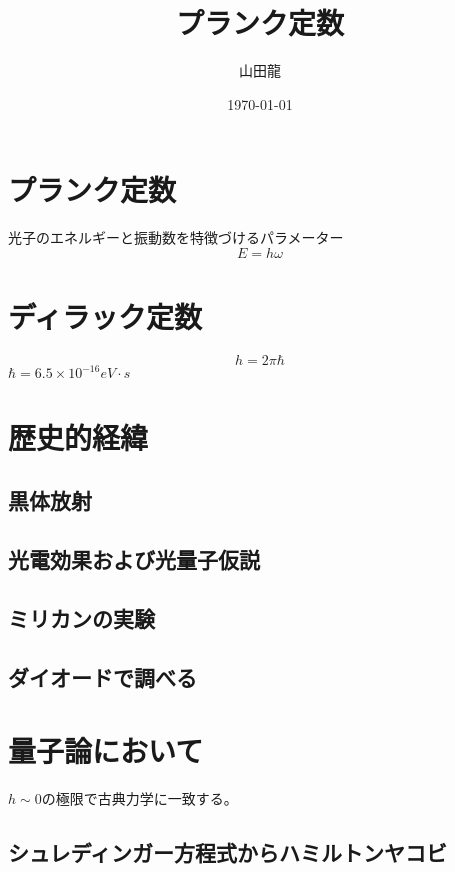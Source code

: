 \documentclass{jsarticle}
\date{\today}
\author{山田龍}
\title{プランク定数}
\newcommand{\beq}{\begin{equation}}
\newcommand{\eeq}{\end{equation}}
\begin{document}
\maketitle
\section{プランク定数}
光子のエネルギーと振動数を特徴づけるパラメーター
\beq
E = h \omega
\eeq

\section{ディラック定数}
\beq
h = 2 \pi \hbar
\eeq
$\hbar = 6.5 \times 10^{-16} eV \cdot s$
\section{歴史的経緯}
\subsection{黒体放射}
\subsection{光電効果および光量子仮説}
\subsection{ミリカンの実験}
\subsection{ダイオードで調べる}
\section{量子論において}
$h \sim 0$の極限で古典力学に一致する。
\subsection{シュレディンガー方程式からハミルトンヤコビ}
\end{document}
